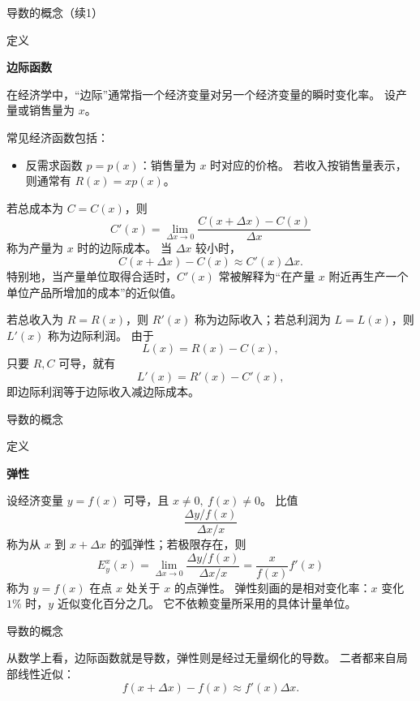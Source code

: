 \documentclass[aspectratio=169,10pt,fontset=fandol]{ctexbeamer}
\begin{document}
\begin{frame}[t,fragile]{导数的概念（续1）}
\footnotesize
\begin{block}{定义}
{\footnotesize
\textbf{边际函数}\par

在经济学中，“边际”通常指一个经济变量对另一个经济变量的瞬时变化率。 设产量或销售量为 $x$。

常见经济函数包括：
\begin{itemize}

\item 反需求函数 $p=p(x)$：销售量为 $x$ 时对应的价格。 若收入按销售量表示，则通常有 $R(x)=xp(x)$。
\end{itemize}

若总成本为 $C=C(x)$，则
\[
C'(x)=\lim_{\Delta x\to0}\frac{C(x+\Delta x)-C(x)}{\Delta x}
\]
称为产量为 $x$ 时的边际成本。 当 $\Delta x$ 较小时，
\[
C(x+\Delta x)-C(x)\approx C'(x)\Delta x.
\]
特别地，当产量单位取得合适时，$C'(x)$ 常被解释为“在产量 $x$ 附近再生产一个单位产品所增加的成本”的近似值。

若总收入为 $R=R(x)$，则 $R'(x)$ 称为边际收入；若总利润为 $L=L(x)$，则 $L'(x)$ 称为边际利润。 由于
\[
L(x)=R(x)-C(x),
\]
只要 $R,C$ 可导，就有
\[
L'(x)=R'(x)-C'(x),
\]
即边际利润等于边际收入减边际成本。

}
\end{block}
\end{frame}
\begin{frame}[t,fragile]{导数的概念}
\normalsize
\begin{block}{定义}
{\normalsize
\textbf{弹性}\par

设经济变量 $y=f(x)$ 可导，且 $x\neq0,\ f(x)\neq0$。 比值
\[
\frac{\Delta y/f(x)}{\Delta x/x}
\]
称为从 $x$ 到 $x+\Delta x$ 的弧弹性；若极限存在，则
\[
E_y^x(x)=\lim_{\Delta x\to0}\frac{\Delta y/f(x)}{\Delta x/x}
=\frac{x}{f(x)}f'(x)
\]
称为 $y=f(x)$ 在点 $x$ 处关于 $x$ 的点弹性。 弹性刻画的是相对变化率：$x$ 变化 $1\%$ 时，$y$ 近似变化百分之几。 它不依赖变量所采用的具体计量单位。

}
\end{block}
\end{frame}
\begin{frame}[t,fragile]{导数的概念}
\normalsize
{\normalsize
从数学上看，边际函数就是导数，弹性则是经过无量纲化的导数。 二者都来自局部线性近似：
\[
f(x+\Delta x)-f(x)\approx f'(x)\Delta x.
\]


}
\end{frame}
\end{document}
